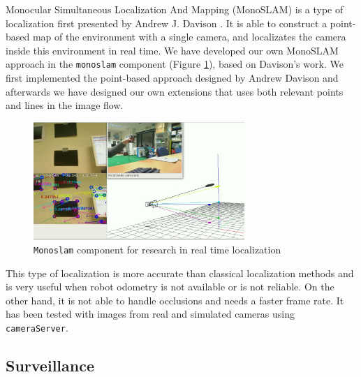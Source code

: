 \documentclass[twocolumn]{svjour3}          %
\begin{document}
Monocular Simultaneous Localization And Mapping (MonoSLAM) is a type of localization first presented by Andrew J. Davison \cite{davison2007}. It is able to construct a point-based map of the environment with a single camera, and localizates the camera inside this environment in real time. We have developed our own MonoSLAM approach in the \texttt{monoslam} component (Figure \ref{fig:monoslam}), based on Davison's work. We first implemented the point-based approach designed by Andrew Davison and afterwards we have designed our own extensions that uses both relevant points and lines in the image flow.

\begin{figure}
\begin{center}
\includegraphics[width=8cm]{monoslam.png}
\caption{\texttt{Monoslam} component for research in real time localization}
\end{center}
\label{fig:monoslam}
\end{figure}

This type of localization is more accurate than classical localization methods and is very useful when robot odometry is not available or is not reliable. On the other hand, it is not able to handle occlusions and needs a faster frame rate. It has been tested with images from real and simulated cameras using \texttt{cameraServer}.

\subsection{Surveillance}
\end{document}
